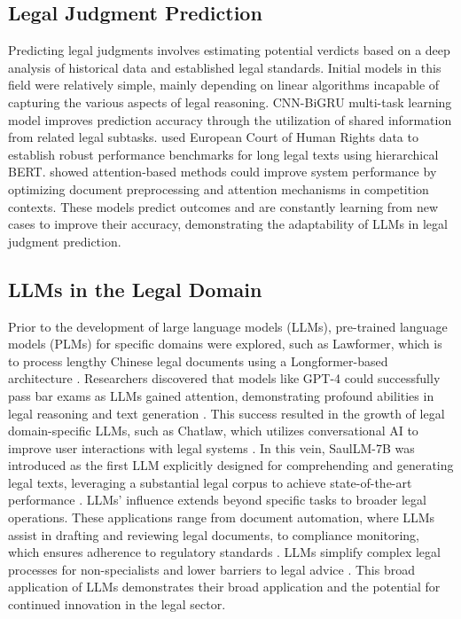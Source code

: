 \subsection{Legal Judgment Prediction}
Predicting legal judgments involves estimating potential verdicts based on a deep analysis of historical data and established legal standards. Initial models in this field were relatively simple, mainly depending on linear algorithms incapable of capturing the various aspects of legal reasoning. \citet{wang2020study} CNN-BiGRU multi-task learning model improves prediction accuracy through the utilization of shared information from related legal subtasks. \citet{chalkidis2019neural} used European Court of Human Rights data to establish robust performance benchmarks for long legal texts using hierarchical BERT. \citet{rusnachenko2023nclu_team} showed attention-based methods could improve system performance by optimizing document preprocessing and attention mechanisms in competition contexts. These models predict outcomes and are constantly learning from new cases to improve their accuracy, demonstrating the adaptability of LLMs in legal judgment prediction.

\subsection{LLMs in the Legal Domain}
Prior to the development of large language models (LLMs), pre-trained language models (PLMs) for specific domains were explored, such as Lawformer, which is to process lengthy Chinese legal documents using a Longformer-based architecture \cite{xiao2021lawformer}. Researchers discovered that models like GPT-4 could successfully pass bar exams as LLMs gained attention, demonstrating profound abilities in legal reasoning and text generation \cite{katz2024gpt}. This success resulted in the growth of legal domain-specific LLMs, such as Chatlaw, which utilizes conversational AI to improve user interactions with legal systems \cite{cui2023chatlaw}. In this vein, SaulLM-7B was introduced as the first LLM explicitly designed for comprehending and generating legal texts, leveraging a substantial legal corpus to achieve state-of-the-art performance \cite{colombo2024saullm}. LLMs' influence extends beyond specific tasks to broader legal operations. These applications range from document automation, where LLMs assist in drafting and reviewing legal documents, to compliance monitoring, which ensures adherence to regulatory standards \cite{Sun2023A}. LLMs simplify complex legal processes for non-specialists and lower barriers to legal advice \cite{Goodson2023Intention}. This broad application of LLMs demonstrates their broad application and the potential for continued innovation in the legal sector.

